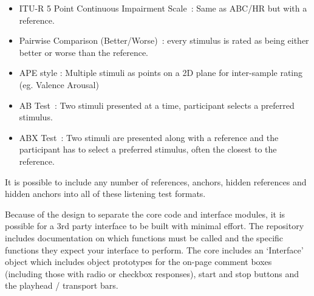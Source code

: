 \documentclass{sig-alternate}
\begin{document}
\begin{itemize}[noitemsep,nolistsep]
		\item ITU-R 5 Point Continuous Impairment Scale~\cite{rec1997bs}: Same as ABC/HR but with a reference.
		\item Pairwise Comparison (Better/Worse)~\cite{david1963method}: every stimulus is rated as being either better or worse than the reference.
		\item APE style \cite{ape}: Multiple stimuli as points on a 2D plane for inter-sample rating (eg. Valence Arousal)
		\item AB Test~\cite{lipshitz1981great}: Two stimuli presented at a time, participant selects a preferred stimulus.
		\item ABX Test~\cite{clark1982high}: Two stimuli are presented along with a reference and the participant has to select a preferred stimulus, often the closest to the reference.
	\end{itemize}
	
	It is possible to include any number of references, anchors, hidden references and hidden anchors into all of these listening test formats.
	
	Because of the design to separate the core code and interface modules, it is possible for a 3rd party interface to be built with minimal effort. The repository includes documentation on which functions must be called and the specific functions they expect your interface to perform. The core includes an `Interface' object which includes object prototypes for the on-page comment boxes (including those with radio or checkbox responses), start and stop buttons and the playhead / transport bars.
	
\end{document}
